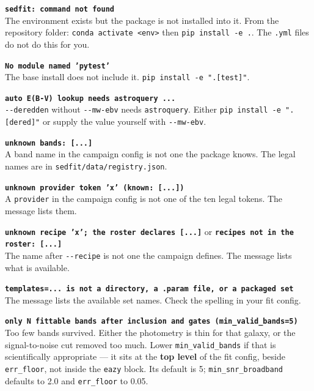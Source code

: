 \documentclass[11pt]{article}
\begin{document}
\vspace{6pt}
\noindent\textbf{\texttt{sedfit: command not found}}\\
The environment exists but the package is not installed into it. From
the repository folder: \texttt{conda activate <env>} then \texttt{pip
install -e .}. The \texttt{.yml} files do not do this for you.

\vspace{6pt}
\noindent\textbf{\texttt{No module named 'pytest'}}\\
The base install does not include it. \texttt{pip install -e ".[test]"}.

\vspace{6pt}
\noindent\textbf{\texttt{auto E(B-V) lookup needs astroquery ...}}\\
\texttt{-{}-deredden} without \texttt{-{}-mw-ebv} needs
\texttt{astroquery}. Either \texttt{pip install -e ".[dered]"} or supply
the value yourself with \texttt{-{}-mw-ebv}.

\vspace{6pt}
\noindent\textbf{\texttt{unknown bands: [...]}}\\
A band name in the campaign config is not one the package knows. The
legal names are in \texttt{sedfit/data/registry.json}.

\vspace{6pt}
\noindent\textbf{\texttt{unknown provider token 'x' (known: [...])}}\\
A \texttt{provider} in the campaign config is not one of the ten legal
tokens. The message lists them.

\vspace{6pt}
\noindent\textbf{\texttt{unknown recipe 'x'; the roster declares [...]}}
or \textbf{\texttt{recipes not in the roster: [...]}}\\
The name after \texttt{-{}-recipe} is not one the campaign defines. The
message lists what is available.

\vspace{6pt}
\noindent\textbf{\texttt{templates=... is not a directory, a .param file,
or a packaged set}}\\
The message lists the available set names. Check the spelling in your fit
config.

\vspace{6pt}
\noindent\textbf{\texttt{only N fittable bands after inclusion and gates
(min\_valid\_bands=5)}}\\
Too few bands survived. Either the photometry is thin for that galaxy, or
the signal-to-noise cut removed too much. Lower
\texttt{min\_valid\_bands} if that is scientifically appropriate --- it
sits at the \textbf{top level} of the fit config, beside
\texttt{err\_floor}, not inside the \texttt{eazy} block. Its default is
5; \texttt{min\_snr\_broadband} defaults to 2.0 and \texttt{err\_floor}
to 0.05.
\end{document}
